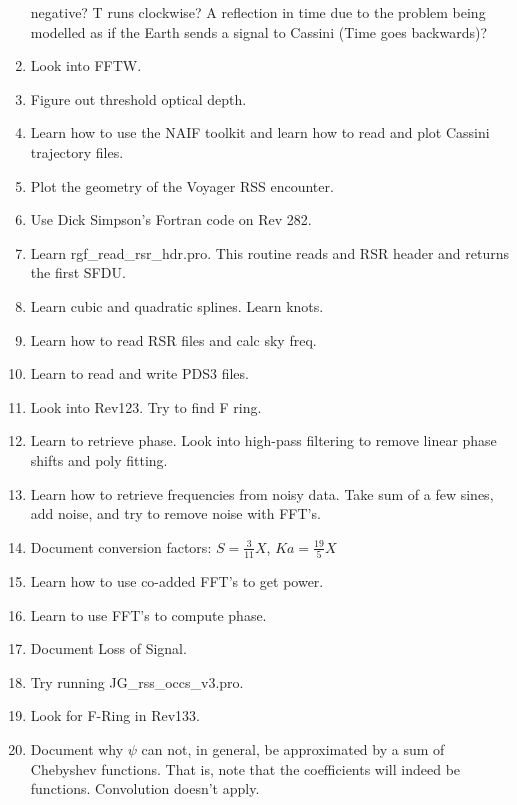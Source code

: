 \documentclass[crop=false,class=article,oneside]{standalone}
\begin{document}
\begin{enumerate}
                  negative? T runs clockwise? A reflection in time due
                  to the problem being modelled as if the Earth sends
                  a signal to Cassini (Time goes backwards)?
            \item Look into FFTW.
            \item Figure out threshold optical depth.
            \item Learn how to use the NAIF toolkit and learn
                  how to read and plot Cassini trajectory files.
            \item Plot the geometry of the Voyager RSS encounter.
            \item Use Dick Simpson's Fortran code on Rev 282.
            \item Learn rgf\_read\_rsr\_hdr.pro. 
                  This routine reads and RSR header and returns
                  the first SFDU.
            \item Learn cubic and quadratic splines. Learn knots.
            \item Learn how to read RSR files and calc sky freq.
            \item Learn to read and write PDS3 files.
            \item Look into Rev123. Try to find F ring.
            \item Learn to retrieve phase. Look into high-pass filtering
                  to remove linear phase shifts and poly fitting.
            \item Learn how to retrieve frequencies from noisy data.
                  Take sum of a few sines, add noise, and try to remove
                  noise with FFT's.
            \item Document conversion factors:
                  $S=\frac{3}{11}X$, $Ka=\frac{19}{5}X$
            \item Learn how to use co-added FFT's to get power.
            \item Learn to use FFT's to compute phase.
            \item Document Loss of Signal.
            \item Try running JG\_rss\_occs\_v3.pro.
            \item Look for F-Ring in Rev133.
            \item Document why $\psi$ can not, in general, be
                  approximated by a sum of Chebyshev functions.
                  That is, note that the coefficients will indeed be
                  functions. Convolution doesn't apply.

\end{enumerate}
\end{document}
